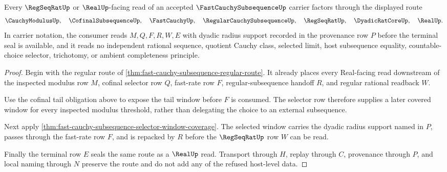 \begin{theorem}
\label{thm:fast-cauchy-subsequence-regseqrat-real-route}
Every $\RegSeqRatUp$ or $\RealUp$-facing read of an accepted $\FastCauchySubsequenceUp$ carrier factors through the displayed route
$$
\CauchyModulusUp,\quad
\CofinalSubsequenceUp,\quad
\FastCauchyUp,\quad
\RegularCauchySubsequenceUp,\quad
\RegSeqRatUp,\quad
\DyadicRatCoreUp,\quad
\RealUp .
$$
In carrier notation, the consumer reads $M,Q,F,R,W,E$ with dyadic radius support recorded in the provenance row $P$ before the terminal seal is available, and it reads no independent rational sequence, quotient Cauchy class, selected limit, host subsequence equality, countable-choice selector, trichotomy, or ambient completeness principle.
\end{theorem}
\begin{proof}
Begin with the regular route of \autoref{thm:fast-cauchy-subsequence-regular-route}. It already places every Real-facing read downstream of the inspected modulus row $M$, cofinal selector row $Q$, fast-rate row $F$, regular-subsequence handoff $R$, and regular rational readback $W$.

Use the cofinal tail obligation above to expose the tail window before $F$ is consumed. The selector row therefore supplies a later covered window for every inspected modulus threshold, rather than delegating the choice to an external subsequence.

Next apply \autoref{thm:fast-cauchy-subsequence-selector-window-coverage}. The selected window carries the dyadic radius support named in $P$, passes through the fast-rate row $F$, and is repacked by $R$ before the $\RegSeqRatUp$ row $W$ can be read.

Finally the terminal row $E$ seals the same route as a $\RealUp$ read. Transport through $H$, replay through $C$, provenance through $P$, and local naming through $N$ preserve the route and do not add any of the refused host-level data.
\end{proof}

